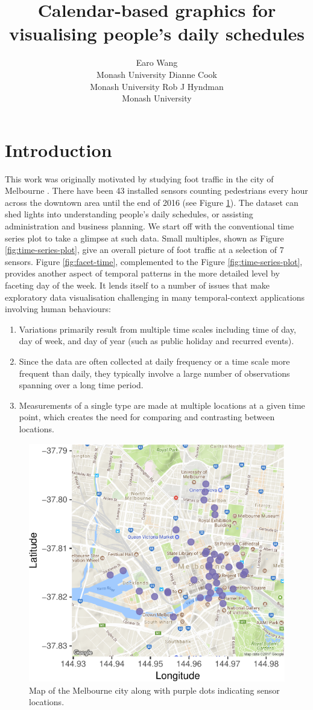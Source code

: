 \documentclass[article]{jss}
\author{
Earo Wang\\Monash University \And Dianne Cook\\Monash University \And Rob J Hyndman\\Monash University
}
\title{Calendar-based graphics for visualising people's daily schedules}
\providecommand{\tightlist}{%
  \setlength{\itemsep}{0pt}\setlength{\parskip}{0pt}}
\begin{document}
\section{Introduction}\label{introduction}

This work was originally motivated by studying foot traffic in the city
of Melbourne \citep{ped}. There have been 43 installed sensors counting
pedestrians every hour across the downtown area until the end of 2016
(see Figure \ref{fig:ped-map}). The dataset can shed lights into
understanding people's daily schedules, or assisting administration and
business planning. We start off with the conventional time series plot
to take a glimpse at such data. Small multiples, shown as Figure
\ref{fig:time-series-plot}, give an overall picture of foot traffic at a
selection of 7 sensors. Figure \ref{fig:facet-time}, complemented to the
Figure \ref{fig:time-series-plot}, provides another aspect of temporal
patterns in the more detailed level by faceting day of the week. It
lends itself to a number of issues that make exploratory data
visualisation challenging in many temporal-context applications
involving human behaviours:

\begin{enumerate}
\def\labelenumi{\arabic{enumi}.}
\tightlist
\item
  Variations primarily result from multiple time scales including time
  of day, day of week, and day of year (such as public holiday and
  recurred events).
\item
  Since the data are often collected at daily frequency or a time scale
  more frequent than daily, they typically involve a large number of
  observations spanning over a long time period.
\item
  Measurements of a single type are made at multiple locations at a
  given time point, which creates the need for comparing and contrasting
  between locations.
\end{enumerate}

\begin{CodeChunk}
\begin{figure}

{\centering \includegraphics[width=0.55\linewidth]{figure/ped-map-1} 

}

\caption[Map of the Melbourne city along with purple dots indicating sensor locations]{Map of the Melbourne city along with purple dots indicating sensor locations.}\label{fig:ped-map}
\end{figure}
\end{CodeChunk}
\end{document}
